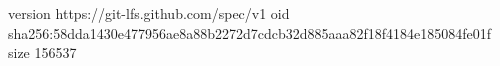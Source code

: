 version https://git-lfs.github.com/spec/v1
oid sha256:58dda1430e477956ae8a88b2272d7cdcb32d885aaa82f18f4184e185084fe01f
size 156537

